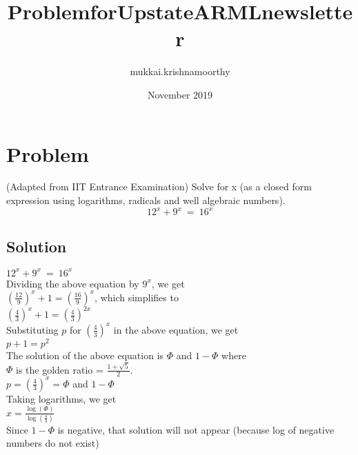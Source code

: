 \documentclass{article}
\title{ProblemforUpstateARMLnewsletter}
\author{mukkai.krishnamoorthy }
\date{November 2019}
\begin{document}
\maketitle

\section{Problem}
(Adapted from IIT Entrance Examination)
Solve for x (as a closed form expression using logarithms, radicals and well algebraic numbers).
\begin{equation}
    {12}^x+9^x~=~{16}^x 
\end{equation}
\begin{newpage}
\section{Solution}
$
    {12}^x+9^x~=~{16}^x $
    \\
    Dividing the above equation by $9^x$, we get \\
    ${(\frac{12}{9})}^x+1={(\frac{16}{9})}^x$, which simplifies to\\
    ${(\frac{4}{3})}^x+1={(\frac{4}{3})}^{2x}$ \\
    Substituting $p$ for ${(\frac{4}{3})}^x$  in the above equation, we get\\
    $p+1=p^2$\\
    The solution of the above equation is $\Phi$ and $1-\Phi$ where \\
    $\Phi$ is the golden ratio = $\frac{1+\sqrt{5}}{2}$.\\
    $p={(\frac{4}{3})}^x= \Phi$ and $1 -\Phi$\\
    Taking logarithms, we get\\
    $x =\frac{\log(\Phi)}{\log(\frac{4}{3})} $\\
    Since $1-\Phi$ is negative, that solution will not appear (because log of negative numbers do not exist)

\end{newpage}
\end{document}
